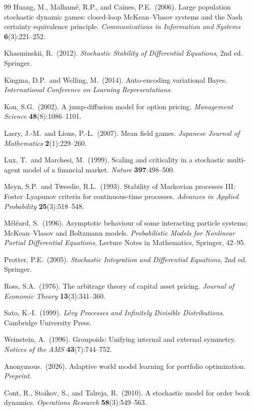 \documentclass[12pt,a4paper]{article}
\theoremstyle{plain}
\theoremstyle{definition}
\newcommand{\1}{\mathbbm{1}}
\begin{document}
\begin{thebibliography}{99}
Huang, M., Malhamé, R.P., and Caines, P.E.\ (2006).
Large population stochastic dynamic games: closed-loop McKean--Vlasov systems
and the Nash certainty equivalence principle.
\textit{Communications in Information and Systems} \textbf{6}(3):221--252.

Khasminskii, R.\ (2012).
\textit{Stochastic Stability of Differential Equations}, 2nd ed.
Springer.

Kingma, D.P.\ and Welling, M.\ (2014).
Auto-encoding variational Bayes.
\textit{International Conference on Learning Representations}.

Kou, S.G.\ (2002).
A jump-diffusion model for option pricing.
\textit{Management Science} \textbf{48}(8):1086--1101.

Lasry, J.-M.\ and Lions, P.-L.\ (2007).
Mean field games.
\textit{Japanese Journal of Mathematics} \textbf{2}(1):229--260.

Lux, T.\ and Marchesi, M.\ (1999).
Scaling and criticality in a stochastic multi-agent model of a financial market.
\textit{Nature} \textbf{397}:498--500.

Meyn, S.P.\ and Tweedie, R.L.\ (1993).
Stability of Markovian processes III: Foster--Lyapunov criteria for
continuous-time processes.
\textit{Advances in Applied Probability} \textbf{25}(3):518--548.

Méléard, S.\ (1996).
Asymptotic behaviour of some interacting particle systems; McKean--Vlasov and
Boltzmann models.
\textit{Probabilistic Models for Nonlinear Partial Differential Equations},
Lecture Notes in Mathematics, Springer, 42--95.

Protter, P.E.\ (2005).
\textit{Stochastic Integration and Differential Equations}, 2nd ed.
Springer.

Ross, S.A.\ (1976).
The arbitrage theory of capital asset pricing.
\textit{Journal of Economic Theory} \textbf{13}(3):341--360.

Sato, K.-I.\ (1999).
\textit{Lévy Processes and Infinitely Divisible Distributions}.
Cambridge University Press.

Weinstein, A.\ (1996).
Groupoids: Unifying internal and external symmetry.
\textit{Notices of the AMS} \textbf{43}(7):744--752.

Anonymous.\ (2026).
Adaptive world model learning for portfolio optimization.
\textit{Preprint}.

Cont, R., Stoikov, S., and Talreja, R.\ (2010).
A stochastic model for order book dynamics.
\textit{Operations Research} \textbf{58}(3):549--563.

\end{thebibliography}
\end{document}
